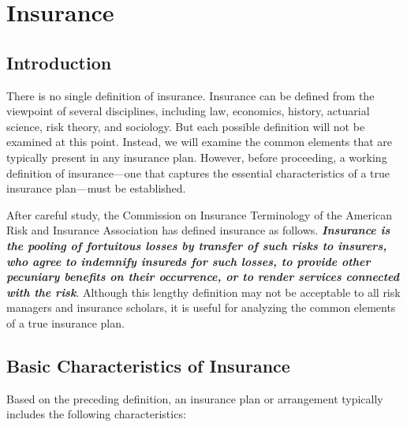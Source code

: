 \chapter{Insurance}
\section{Introduction}
There is no single definition of insurance. Insurance can be defined from the viewpoint of several disciplines, including law, economics, history, actuarial science, risk theory, and sociology. But each possible definition will not be examined at this point. Instead, we will examine the common elements that are typically present in any insurance plan. However, before proceeding, a working definition of insurance—one that captures the essential characteristics of a true insurance plan—must be established.\\
\par
After careful study, the Commission on Insurance
Terminology of the American Risk and Insurance Association has defined insurance as follows. \textit{\textbf{Insurance is the pooling of fortuitous losses by transfer of such risks to insurers, who agree to indemnify insureds for such losses, to provide other pecuniary benefits on their occurrence, or to render services connected with the risk}}. Although this lengthy definition may not be acceptable to all risk managers and insurance scholars, it is useful for analyzing the common elements of a true insurance plan.
%
\section{Basic Characteristics of Insurance}
Based on the preceding definition, an insurance plan or arrangement typically includes the following
characteristics:
